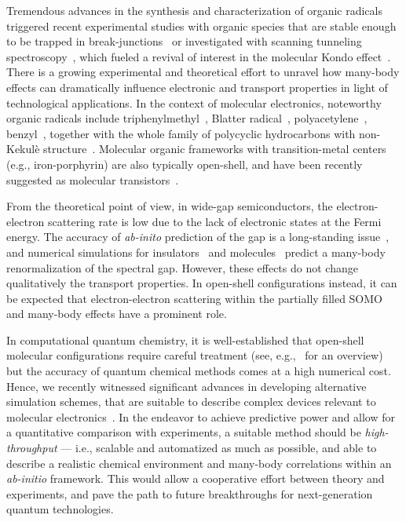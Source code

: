 \documentclass[aps,prx,twocolumn,superscriptaddress]{revtex4-2}
\begin{document}
Tremendous advances in the synthesis and characterization of organic radicals 
triggered recent experimental studies 
with organic species that are stable enough to be trapped 
in break-junctions~\cite{frisendaNL15,bejaranoJACS140} 
or investigated with scanning tunneling spectroscopy~\cite{pateraAC58,zhengNC11,liuJACS135,zhangNC4}, 
which fueled a revival of interest in the molecular Kondo effect~\cite{requistPNAS111,frisendaNL15,droghettiPRB95,appeltNano10,pateraAC58,pateraAC58,zhengNC11,liuJACS135,zhangNC4}. 
There is a growing experimental and theoretical effort 
to unravel how many-body effects can dramatically influence electronic and transport properties 
in light of technological applications. 
In the context of molecular electronics, noteworthy organic radicals 
include triphenylmethyl~\cite{frisendaNL15,bejaranoJACS140,appeltNano10}, Blatter radical~\cite{jiMCF12}, polyacetylene~\cite{bergfield2011novel,hernangmez-prezNL20}, benzyl~\cite{smeu2010calculations,herrmann2010organic}, 
together with the whole family of polycyclic hydrocarbons with 
non-Kekul\`e structure~\cite{mishra2021observation,turco2021surface,jacob2022theory,zhengNC11}. 
Molecular organic frameworks with transition-metal centers (e.g., iron-porphyrin) 
are also typically open-shell, 
and have been recently suggested as molecular transistors~\cite{bhandaryNA17,gao2210.13610}.

From the theoretical point of view, 
in wide-gap semiconductors, the electron-electron scattering rate is low 
due to the lack of electronic states at the Fermi energy. 
The accuracy of \emph{ab-inito} prediction of the gap is a long-standing issue~\cite{perdewIJQC28}, 
and numerical simulations for insulators~\cite{sentef2009correlations,hueserPRB87} and 
molecules~\cite{valliPRB86,valliPRB91,valliPRB94,schueler2017realistic,valliNL18,valliPRB100,pudleiner2019parquet,hueserPRB87} 
predict a many-body renormalization of the spectral gap. 
However, these effects do not change qualitatively the transport properties. 
In open-shell configurations instead, it can be expected that electron-electron scattering  
within the partially filled SOMO and many-body effects have a prominent role. 

In computational quantum chemistry, it is well-established that open-shell molecular configurations  
require careful treatment (see, e.g.,~\cite{krylov2017} for an overview) 
but the accuracy of quantum chemical methods comes at a high numerical cost. 
Hence, we recently witnessed significant advances  
in developing alternative simulation schemes, that are suitable to describe complex devices 
relevant to molecular electronics~\cite{jacob2015towards,droghettiPRB95,droghettiPRB106}. 
In the endeavor to achieve predictive power and allow for a quantitative comparison with experiments, 
a suitable method should be \emph{high-throughput} --- i.e., scalable and automatized as much as possible, 
and able to describe a realistic chemical environment and many-body correlations 
within an \emph{ab-initio} framework. 
This would allow a cooperative effort between theory and experiments, 
and pave the path to future breakthroughs for next-generation quantum technologies. 
\end{document}
